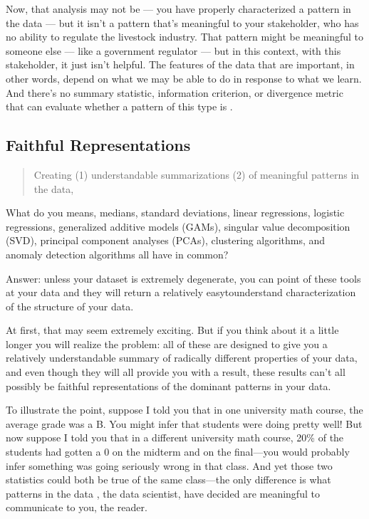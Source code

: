 \documentclass[letterpaper,10pt,english]{jupyterBook}
\begin{document}
\sphinxAtStartPar
Now, that analysis may not be  — you have properly characterized a pattern in the data — but it isn’t a pattern that’s meaningful to your stakeholder, who has no ability to regulate the livestock industry. That pattern might be meaningful to someone else — like a government regulator — but in this context, with this stakeholder, it just isn’t helpful. The features of the data that are important, in other words, depend on what we may be able to do in response to what we learn. And there’s no summary statistic, information criterion, or divergence metric that can evaluate whether a pattern of this type is .


\subsection{Faithful Representations}
\label{\detokenize{30_questions/15_answering_exploratory_questions:faithful-representations}}\begin{quote}

\sphinxAtStartPar
Creating (1) understandable summarizations (2) of meaningful patterns in the data, 
\end{quote}

\sphinxAtStartPar
What do you means, medians, standard deviations, linear regressions, logistic regressions, generalized additive models (GAMs), singular value decomposition (SVD), principal component analyses (PCAs), clustering algorithms, and anomaly detection algorithms all have in common?

\sphinxAtStartPar
Answer: unless your dataset is extremely degenerate, you can point  of these tools at your data and they will return a relatively easy\sphinxhyphen{}to\sphinxhyphen{}understand characterization of the structure of your data.

\sphinxAtStartPar
At first, that may seem extremely exciting. But if you think about it a little longer you will realize the problem: all of these are designed to give you a relatively understandable summary of radically different properties of your data, and even though they will all provide you with a result, these results can’t all possibly be faithful representations of the dominant patterns in your data.

\sphinxAtStartPar
To illustrate the point, suppose I told you that in one university math course, the average grade was a B\sphinxhyphen{}. You might infer that students were doing pretty well! But now suppose I told you that in a different university math course, 20\% of the students had gotten a 0 on the midterm and on the final—you would probably infer something was going seriously wrong in that class. And yet those two statistics could both be true of the same class—the only difference is what patterns in the data , the data scientist, have decided are meaningful to communicate to you, the reader.
\end{document}
